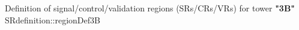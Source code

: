 {%
			  \hline }
			{Definition of signal/control/validation regions (SRs/CRs/VRs) for tower \textbf{"3B"}}
			{SRdefinition::regionDef3B}
			\renewcommand{\arraystretch}{1.}
